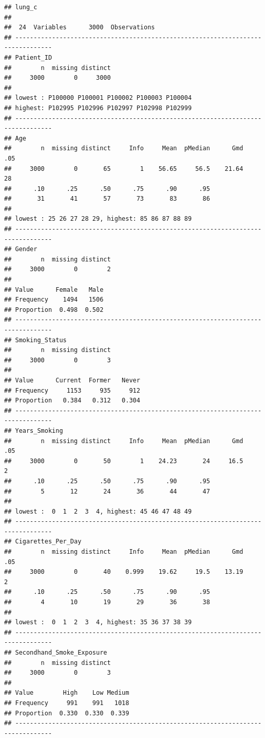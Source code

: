 \documentclass[
]{article}
\begin{document}
\begin{verbatim}
## lung_c 
## 
##  24  Variables      3000  Observations
## --------------------------------------------------------------------------------
## Patient_ID 
##        n  missing distinct 
##     3000        0     3000 
## 
## lowest : P100000 P100001 P100002 P100003 P100004
## highest: P102995 P102996 P102997 P102998 P102999
## --------------------------------------------------------------------------------
## Age 
##        n  missing distinct     Info     Mean  pMedian      Gmd      .05 
##     3000        0       65        1    56.65     56.5    21.64       28 
##      .10      .25      .50      .75      .90      .95 
##       31       41       57       73       83       86 
## 
## lowest : 25 26 27 28 29, highest: 85 86 87 88 89
## --------------------------------------------------------------------------------
## Gender 
##        n  missing distinct 
##     3000        0        2 
##                         
## Value      Female   Male
## Frequency    1494   1506
## Proportion  0.498  0.502
## --------------------------------------------------------------------------------
## Smoking_Status 
##        n  missing distinct 
##     3000        0        3 
##                                   
## Value      Current  Former   Never
## Frequency     1153     935     912
## Proportion   0.384   0.312   0.304
## --------------------------------------------------------------------------------
## Years_Smoking 
##        n  missing distinct     Info     Mean  pMedian      Gmd      .05 
##     3000        0       50        1    24.23       24     16.5        2 
##      .10      .25      .50      .75      .90      .95 
##        5       12       24       36       44       47 
## 
## lowest :  0  1  2  3  4, highest: 45 46 47 48 49
## --------------------------------------------------------------------------------
## Cigarettes_Per_Day 
##        n  missing distinct     Info     Mean  pMedian      Gmd      .05 
##     3000        0       40    0.999    19.62     19.5    13.19        2 
##      .10      .25      .50      .75      .90      .95 
##        4       10       19       29       36       38 
## 
## lowest :  0  1  2  3  4, highest: 35 36 37 38 39
## --------------------------------------------------------------------------------
## Secondhand_Smoke_Exposure 
##        n  missing distinct 
##     3000        0        3 
##                                
## Value        High    Low Medium
## Frequency     991    991   1018
## Proportion  0.330  0.330  0.339
## --------------------------------------------------------------------------------

\end{verbatim}
\end{document}
